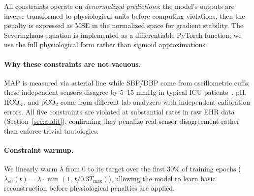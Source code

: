 \documentclass{article}
\begin{document}
All constraints operate on \emph{denormalized predictions}: the model's outputs are inverse-transformed to physiological units before computing violations, then the penalty is expressed as MSE in the normalized space for gradient stability.
The Severinghaus equation is implemented as a differentiable PyTorch function; we use the full physiological form rather than sigmoid approximations.

\paragraph{Why these constraints are not vacuous.}
MAP is measured via arterial line while SBP/DBP come from oscillometric cuffs; these independent sensors disagree by 5--15 mmHg in typical ICU patients~\citep{wax2011invasive}.
pH, HCO$_3^-$, and pCO$_2$ come from different lab analyzers with independent calibration errors.
All five constraints are violated at substantial rates in raw EHR data (Section~\ref{sec:audit}), confirming they penalize real sensor disagreement rather than enforce trivial tautologies.

\paragraph{Constraint warmup.}
We linearly warm $\lambda$ from 0 to its target over the first 30\% of training epochs ($\lambda_{\text{eff}}(t) = \lambda \cdot \min(1,\, t / 0.3 T_{\text{max}})$), allowing the model to learn basic reconstruction before physiological penalties are applied.
\end{document}
